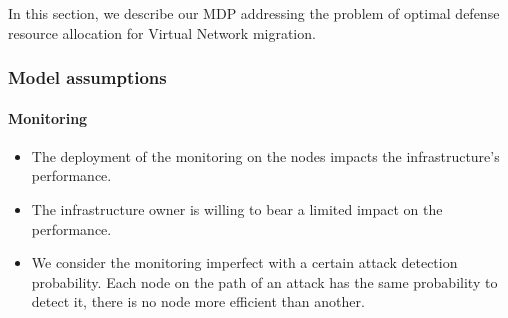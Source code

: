 \label{sec:mdp-model}
In this section, we describe our MDP addressing the problem of optimal defense resource allocation for Virtual Network migration.

\subsubsection{Model assumptions}
\label{sec:mdp-model-assumption}

\paragraph{Monitoring}
\begin{itemize}
    \item The deployment of the monitoring on the nodes impacts the infrastructure's performance. 
    
    \item The infrastructure owner is willing to bear a limited impact on the performance.
    
    \item We consider the monitoring imperfect with a certain attack detection probability.
    Each node on the path of an attack has the same probability to detect it, \ie there is no node more efficient than another. 
\end{itemize}


